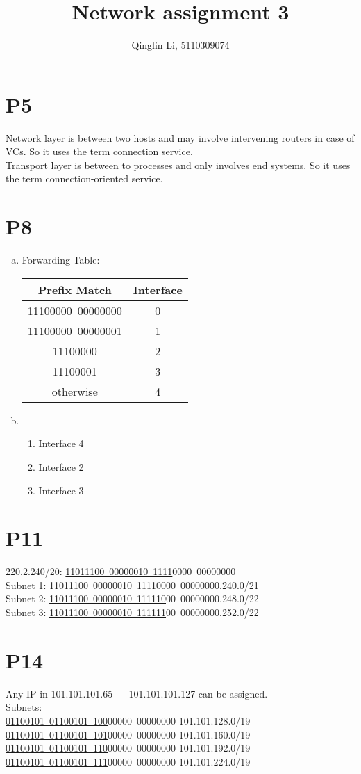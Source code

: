 \documentclass[12pt]{article}
\date{}
\title{Network assignment 3}
\author{Qinglin Li, 5110309074}
\begin{document}
\maketitle
\section*{P5}
Network layer is between two hosts and may involve intervening routers in case of VCs. So it uses the term connection service.\\
Transport layer is between to processes and only involves end systems. So it uses the term connection-oriented service.

\section*{P8}
\begin{enumerate}[a.]
\item 
Forwarding Table:\\
\begin{tabular}{|c|c|}
\hline
Prefix Match & Interface
\\ \hline 
11100000~00000000 & 0 \\ 
\hline 
11100000~00000001 & 1 \\ 
\hline 
11100000 & 2 \\ 
\hline 
11100001 & 3 \\ 
\hline 
otherwise & 4 \\ 
\hline 
\end{tabular} 
\item
\begin{enumerate}[1.]
\item Interface 4
\item Interface 2
\item Interface 3
\end{enumerate}
\end{enumerate}
\section*{P11}
220.2.240/20: \underline{11011100~00000010~1111}0000~00000000\\
Subnet 1: \underline{11011100~00000010~11110}000~00000000.240.0/21\\
Subnet 2: \underline{11011100~00000010~111110}00~00000000.248.0/22\\
Subnet 3: \underline{11011100~00000010~111111}00~00000000.252.0/22
\section*{P14}
Any IP in 101.101.101.65 --- 101.101.101.127 can be assigned.\\
Subnets:\\
\underline{01100101~01100101~100}00000~00000000 101.101.128.0/19\\
\underline{01100101~01100101~101}00000~00000000 101.101.160.0/19\\
\underline{01100101~01100101~110}00000~00000000 101.101.192.0/19\\
\underline{01100101~01100101~111}00000~00000000 101.101.224.0/19
\end{document}
